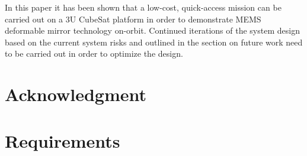 \documentclass[12pt]{article}
\begin{document}
In this paper it has been shown that a low-cost, quick-access mission can be carried out on a 3U CubeSat platform in order to demonstrate MEMS deformable mirror technology on-orbit.  Continued iterations of the system design based on the current system risks and outlined in the section on future work need to be carried out in order to optimize the design.

	

		
\FloatBarrier
\newpage

\section{Acknowledgment}
	
	
\FloatBarrier
\newpage
\appendix
\section{Requirements} \label{app:requirements}



\newpage
\end{document}
